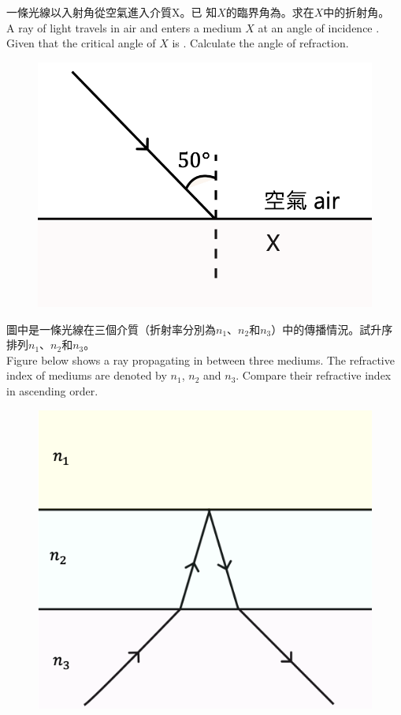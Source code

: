 \documentclass[beamer=true]{standalone}
\begin{document}
\begin{eg}
一條光線以入射角從空氣進入介質X。已 知$X$的臨界角為。求在$X$中的折射角。\\A ray of light travels in air and enters a medium $X$ at an angle of incidence . Given that the critical angle of $X$ is . Calculate the angle of refraction.
    \begin{figure}
        \raggedleft
        \includegraphics[width=0.45\linewidth]{assets/290132830912ge.png}
    \end{figure}
\end{eg}

\begin{eg}
    圖中是一條光線在三個介質（折射率分別為$n_1$、$n_2$和$n_3$）中的傳播情況。試升序排列$n_1$、$n_2$和$n_3$。\\Figure below shows a ray propagating in between three mediums. The refractive index of mediums are denoted by $n_1$, $n_2$ and $n_3$. Compare their refractive index in ascending order.
    \begin{figure}
        \raggedleft
        \includegraphics[width=0.4\linewidth]{assets/910991m93.png}
    \end{figure}
\end{eg}
\end{document}
